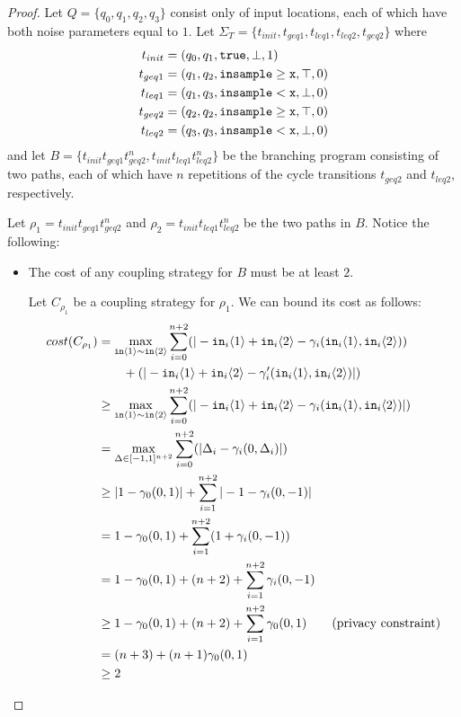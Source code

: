 \begin{proof}
    Let $Q = \{q_0, q_1, q_2, q_3\}$ consist only of input locations, each of which have both noise parameters equal to $1$. Let $\Sigma_T = \{t_{init}, t_{geq1}, t_{leq1}, t_{leq2}, t_{geq2}\}$ where 
    \begin{align*}
        t_{init} &= (q_0, q_1, \texttt{true}, \bot, 1)\\
        t_{geq1} &= (q_1, q_2, \gguard[\texttt{x}], \top, 0)\\
        t_{leq1} &= (q_1, q_3, \lguard[\texttt{x}], \bot, 0)\\
        t_{geq2} &= (q_2, q_2, \gguard[\texttt{x}], \top, 0)\\
        t_{leq2} &= (q_3, q_3, \lguard[\texttt{x}], \bot, 0)
    \end{align*}
    and let $B = \{t_{init}t_{geq1}t_{geq2}^n, t_{init}t_{leq1}t_{leq2}^n\}$ be the branching program consisting of two paths, each of which have $n$ repetitions of the cycle transitions $t_{geq2}$ and $t_{leq2}$, respectively.

    Let $\rho_1 = t_{init}t_{geq1}t_{geq2}^n$ and $\rho_2 = t_{init}t_{leq1}t_{leq2}^n$ be the two paths in $B$. Notice the following: 
    
    \begin{itemize}
        \item The cost of any coupling strategy for $B$ must be at least $2$.
        
        Let $C_{\rho_1}$ be a coupling strategy for $\rho_1$. We can bound its cost as follows: 
        \begin{align*}
            cost(C_{\rho_1}) &= \max_{\texttt{in}\brangle{1}\sim\texttt{in}\brangle{2}}\sum_{i=0}^{n+2}(|-\texttt{in}_i\brangle{1}+\texttt{in}_i\brangle{2}-\gamma_i(\texttt{in}_i\brangle{1}, \texttt{in}_i\brangle{2}))\\&\qquad+(|-\texttt{in}_i\brangle{1}+\texttt{in}_i\brangle{2}-\gamma_i'(\texttt{in}_i\brangle{1}, \texttt{in}_i\brangle{2})|)\\
            &\geq \max_{\texttt{in}\brangle{1}\sim\texttt{in}\brangle{2}} \sum_{i=0}^{n+2}(|-\texttt{in}_i\brangle{1}+\texttt{in}_i\brangle{2}-\gamma_i(\texttt{in}_i\brangle{1}, \texttt{in}_i\brangle{2})|)\\
            &= \max_{\Delta \in [-1, 1]^{n+2}} \sum_{i=0}^{n+2}(|\Delta_i-\gamma_i(0, \Delta_i)|)\\
            &\geq |1 - \gamma_0(0, 1)| + \sum_{i=1}^{n+2}|-1-\gamma_i(0, -1)|\\
            &= 1 - \gamma_0(0, 1) + \sum_{i=1}^{n+2} (1+\gamma_i(0, -1))\\
            &= 1 - \gamma_0(0, 1) + (n + 2) + \sum_{i=1}^{n+2}\gamma_i(0, -1)\\
            &\geq 1 - \gamma_0(0, 1) + (n + 2) + \sum_{i=1}^{n+2}\gamma_0(0, 1) \qquad \text{(privacy constraint)}\\
            &= (n + 3) + (n + 1) \gamma_0(0, 1)\\
            &\geq 2
        \end{align*}


\end{itemize}
\end{proof}
